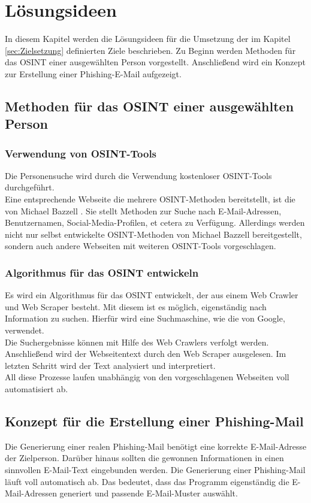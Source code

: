 
\chapter{Lösungsideen}  %
\label{cha:Lösungsideen} %
In diesem Kapitel werden die Lösungsideen für die Umsetzung der im Kapitel \ref{sec:Zielsetzung} definierten Ziele beschrieben. Zu Beginn werden Methoden für das OSINT einer ausgewählten Person vorgestellt. Anschließend wird ein Konzept zur Erstellung einer Phishing-E-Mail aufgezeigt.

\section{Methoden für das OSINT einer ausgewählten Person}
	\subsection{Verwendung von OSINT-Tools}
	Die Personensuche wird durch die Verwendung kostenloser OSINT-Tools durchgeführt.\\ 
	Eine entsprechende Webseite die mehrere OSINT-Methoden bereitstellt, ist die von Michael Bazzell \cite{intelTechniques}. Sie stellt Methoden zur Suche nach E-Mail-Adressen, Benutzernamen, Social-Media-Profilen, et cetera zu Verfügung. Allerdings werden nicht nur selbst entwickelte OSINT-Methoden von Michael Bazzell bereitgestellt, sondern auch andere Webseiten mit weiteren OSINT-Tools vorgeschlagen.
	
	\subsection{Algorithmus für das OSINT entwickeln}
	Es wird ein Algorithmus für das OSINT entwickelt, der aus einem Web Crawler und Web Scraper besteht. Mit diesem ist es möglich, eigenständig nach Information zu suchen. Hierfür wird eine Suchmaschine, wie die von Google, verwendet.\\
	Die Suchergebnisse können mit Hilfe des Web Crawlers verfolgt werden. Anschließend wird der Webseitentext durch den Web Scraper ausgelesen. Im letzten Schritt wird der Text analysiert und interpretiert.\\
	All diese Prozesse laufen unabhängig von den vorgeschlagenen Webseiten voll automatisiert ab.

	
\section{Konzept für die Erstellung einer Phishing-Mail}
Die Generierung einer realen Phishing-Mail benötigt eine korrekte E-Mail-Adresse der Zielperson. Darüber hinaus sollten die gewonnen Informationen in einen sinnvollen E-Mail-Text eingebunden werden. Die Generierung einer Phishing-Mail läuft voll automatisch ab. Das bedeutet, dass das Programm eigenständig die E-Mail-Adressen generiert und passende E-Mail-Muster auswählt.
	
